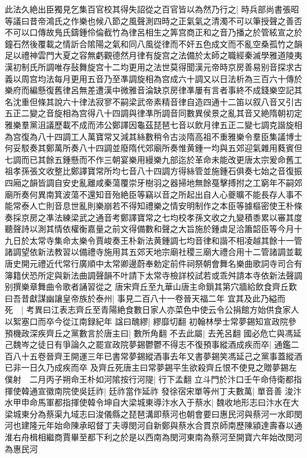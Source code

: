 此法久絶出臣獨見乞集百官校其得失詔從之百官皆以為然乃行之|{
	時兵部尚書張昭等議曰昔帝鴻氏之作樂也候八節之風聲測四時之正氣氣之清濁不可以筆授聲之善否不可以口傳故鳬氏鑄鍾伶倫截竹為律呂相生之筭宫商正和之音乃播之於管絃宣之於鐘石然後覆載之情訢合隂陽之氣和同八風從律而不奸五色成文而不亂空桑孤竹之韻足以禮神雲門大夏之容無虧觀德然月律有旋宫之法備於太師之職經秦滅學雅道陵夷漢初制氏所調唯存鼔舞旋宫十二均更用之法世莫得聞漢元帝時京房善易别音探求古義以周宫均法每月更用五音乃至凖調旋相為宫成六十調又以日法析為三百六十傳於樂府而編懸復舊律呂無差遭漢中微雅音淪缺京房律凖屢有言者事終不成錢樂空記其名沈重但條其說六十律法寂寥不嗣梁武帝素精音律自造四通十二笛以叙八音又引古五正二變之音旋相為宫得八十四調與律凖所調音同數異侯景之亂其音又絶隋朝初定雅樂羣黨沮議歷載不成而沛公鄭譯因龜茲琵琶七音以飲月律五正二變七調克諧旋相為宫復為八十四調工人萬寶常又減其絲數稍令古淡隋高祖不重雅樂令羣臣集議博士何妥駁奏其鄭萬所奏八十四調並廢隋代郊廟所奏惟黄鍾一均與五郊迎氣雜用蕤賓但七調而已其餘五鍾懸而不作三朝宴樂用縵樂九部迄於革命未能改更唐太宗爰命舊工祖孝孫張文收整比鄭譯寶常所均七音八十四調方得絲管並施鍾石俱奏七始之音復振四廂之韻皆調自安史亂離咸秦蕩覆崇牙樹羽之器掃地無餘戞擊搏拊之工窮年不嗣郊廟所奏何異南箕波蕩不還知音殆絶臣等竊以音之所起出自人心夔曠不能長存人事不能常泰人亡則音息世亂則樂崩若不得知禮樂之情安明制作之本臣等據樞密使王朴條奏採京房之凖法練梁武之通音考鄭譯寶常之七均校孝孫文收之九變積黍累以審其度聽聲詩以測其情依權衡嘉量之前文得備數和聲之大旨施於鍾虡足洽簫韶臣等今月十九日於太常寺集命太樂令賈峻奏王朴新法黄鍾調七均音律和諧不相凌越其餘十一管諸調望依新法教習以備禮寺施用其五郊天地宗廟社稷三廟大禮合用十二管諸調並載唐史開元禮近代常行廣順中太常卿邊蔚奉勅定前件祠祭朝會舞名樂曲歌詞寺司合有簿籍伏恐所定與新法曲調聲韻不叶請下太常寺檢詳校試若或乖舛請本寺依新法聲調别撰樂章舞曲令歌者誦習從之}
唐宋齊丘至九華山唐主命鎻其第穴牆給飲食齊丘歎曰吾昔獻謀幽讓皇帝族於泰州|{
	事見二百八十一卷晉天福二年}
宜其及此乃縊而死　|{
	考異曰江表志齊丘至青陽絶食數日家人亦菜色中使云令公捐館方始供食家人以絮塞口而卒今從江南録紀年}
諡曰醜繆|{
	繆靡切翻}
初翰林學士常夢錫知宣政院參預機政深疾齊丘之黨數言於唐主曰|{
	數所角翻}
不去此屬|{
	去羌呂翻}
國必危亡與馮延己魏岑之徒日有爭論久之罷宣政院夢錫鬱鬱不得志不復預事縱酒成疾而卒|{
	通鑑二百八十五卷晉齊王開運三年已書常夢錫縱酒事去年又書夢錫笑馮延己之黨事蓋縱酒已非一日久乃成疾而卒}
及齊丘死唐主曰常夢錫平生欲殺齊丘恨不使見之贈夢錫左僕射　二月丙子朔命王朴如河隂按行河隄|{
	行下孟翻}
立斗門於汴口壬午命侍衛都指揮使韓通宣徽南院使吳廷祚|{
	廷祚當作延祚}
發徐宿宋單等州丁夫數萬|{
	單音善}
浚汴水甲申命馬軍都指揮使韓令坤自大梁城東導汴水入于蔡水|{
	魏收地形志曰汴水在大梁城東分為蔡渠九域志曰浚儀縣之琵琶溝即蔡河也朝會要曰惠民河與蔡河一水即閔河也建隆元年始命陳承昭督丁夫導閔河自新鄭與蔡水合貫京師南歷陳潁達壽春以通淮右舟楫相繼商賈畢至都下利之於是以西南為閔河東南為蔡河至開寶六年始改閔河為惠民河}
